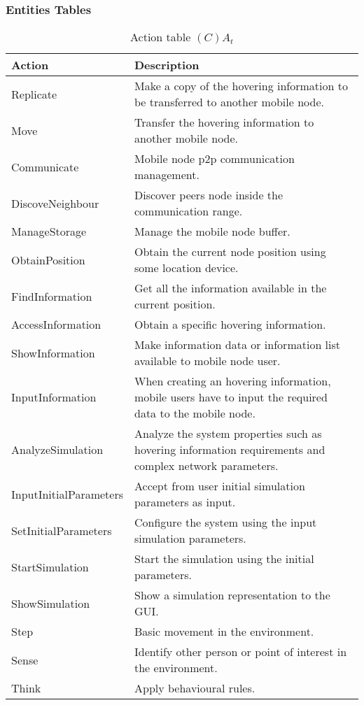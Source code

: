 \subsubsection{Entities Tables}

\begin{table}[H]
	\centering
	\begin{tabular}{|p{4cm}|p{8cm}|}
			\hline
			\textbf{Action} & \textbf{Description} \\
			\hline
			Replicate & Make a copy of the hovering information to be transferred to
			another mobile node. \\
			\hline
			Move & Transfer the hovering information to another mobile node. \\
			\hline
			Communicate & Mobile node p2p communication management.\\
			\hline
			DiscoveNeighbour & Discover peers node inside the communication range. \\
			\hline
			ManageStorage & Manage the mobile node buffer. \\
			\hline
			ObtainPosition & Obtain the current node position using some location device. \\
			\hline
			FindInformation & Get all the information available in the current position.\\
			\hline
			AccessInformation & Obtain a specific hovering information. \\
			\hline
			ShowInformation & Make information data or information list available to
			mobile node user.\\
			\hline
			InputInformation & When creating an hovering information, mobile users have to
			input the required data to the mobile node. \\
			\hline
			AnalyzeSimulation & Analyze the system properties such as hovering
			information requirements and complex network parameters. \\
			\hline
			InputInitialParameters & Accept from user initial simulation parameters
			as input. \\
			\hline
			SetInitialParameters & Configure the system using the input simulation parameters. \\
			\hline
			StartSimulation & Start the simulation using the initial parameters. \\
			\hline
			ShowSimulation & Show a simulation representation to the GUI. \\
			\hline
			Step & Basic movement in the environment. \\
			\hline
			Sense & Identify other person or point of interest in the environment. \\
			\hline
			Think & Apply behavioural rules. \\
			\hline
		\end{tabular}
	\caption{Action table $(C)A_t$}
	\label{tab:cat}
\end{table}

